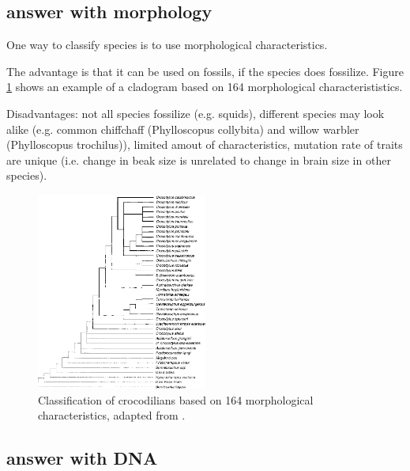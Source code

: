 {%
\subsection{answer with morphology}

One way to classify species is to use morphological characteristics.

The advantage is that it can be used on fossils, if the
species does fossilize.
Figure \ref{fig:crocodilians_cladogram_morphology} shows an
example of a cladogram based on 164 morphological 
characterististics.

Disadvantages: not all species fossilize (e.g. squids), 
different species may look alike (e.g. common chiffchaff (Phylloscopus collybita) 
and willow warbler (Phylloscopus trochilus)), limited amout of characteristics,
mutation rate of traits are unique (i.e. change in beak
size is unrelated to change in brain size in other species).

\begin{figure}[H]
  \includegraphics[width=0.5\textwidth]{brochu_2000.png}
  \caption{
    Classification of crocodilians based on 164 morphological
    characteristics, adapted from \cite{brochu2000phylogenetic}.
  }
  \label{fig:crocodilians_cladogram_morphology}
\end{figure}

\subsection{answer with DNA}

}
